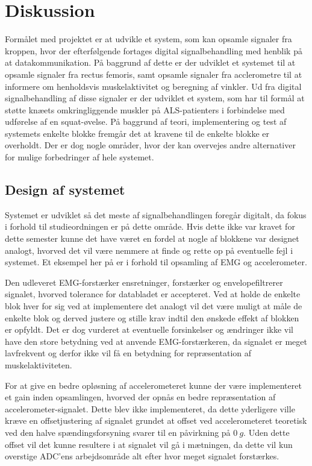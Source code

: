 \section{Diskussion}
Formålet med projektet er at udvikle et system, som kan opsamle signaler fra kroppen, hvor der efterfølgende fortages digital signalbehandling med henblik på at datakommunikation. På baggrund af dette er der udviklet et systemet til at opsamle signaler fra rectus femoris, samt opsamle signaler fra acclerometre til at informere om henholdsvis muskelaktivitet og beregning af vinkler. Ud fra digital signalbehandling af disse signaler er der udviklet et system, som har til formål at støtte knæets omkringliggende muskler på ALS-patienters i forbindelse med udførelse af en squat-øvelse. På baggrund af teori, implementering og test af systemets enkelte blokke fremgår det at kravene til de enkelte blokke er overholdt. Der er dog nogle områder, hvor der kan overvejes andre alternativer for mulige forbedringer af hele systemet. 

\subsection{Design af systemet}
Systemet er udviklet så det meste af signalbehandlingen foregår digitalt, da fokus i forhold til studieordningen er på dette område. Hvis dette ikke var kravet for dette semester kunne det have været en fordel at nogle af blokkene var designet analogt, hvorved det vil være nemmere at finde  og rette op på eventuelle fejl i systemet. Et eksempel her på er i forhold til opsamling af EMG og accelerometer. 

Den udleveret EMG-forstærker ensretninger, forstærker og envelopefiltrerer signalet, hvorved tolerance for databladet er accepteret. Ved at holde de enkelte blok hver for sig ved at implementere det analogt vil det være muligt at måle de enkelte blok og derved justere og stille krav indtil den ønskede effekt af blokken er opfyldt. Det er dog vurderet at eventuelle forsinkelser og ændringer ikke vil have den store betydning ved at anvende EMG-forstærkeren, da signalet er meget lavfrekvent og derfor ikke vil få en betydning for repræsentation af muskelaktiviteten. 

For at give en bedre opløsning af accelerometeret kunne der være implementeret et gain inden opsamlingen, hvorved der opnås en bedre repræsentation af accelerometer-signalet. Dette blev ikke implementeret, da dette yderligere ville kræve en offsetjustering af signalet grundet at offset ved accelerometeret teoretisk ved den halve spændingsforsyning svarer til en påvirkning på $0~g$. Uden dette offset vil det kunne resultere i at signalet vil gå i mætningen, da dette vil kun overstige ADC'ens arbejdsområde alt efter hvor meget signalet forstærkes. 

